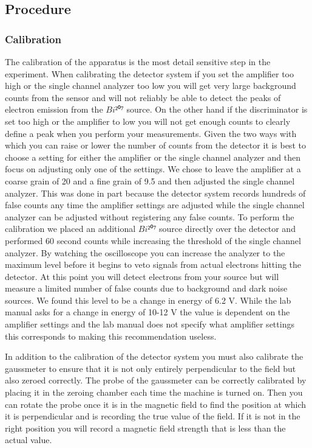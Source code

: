 \subsection{Procedure}

\subsubsection{Calibration}
The calibration of the apparatus is the most detail sensitive step in the experiment.  When calibrating the detector system if you set the amplifier too high or the single channel analyzer too low you will get very large background counts from the sensor and will not reliably be able to detect the peaks of electron emission from the $Bi²⁰⁷$ source.  On the other hand if the discriminator is set too high or the amplifier to low you will not get enough counts to clearly define a peak when you perform your measurements. Given the two ways with which you can raise or lower the number of counts from the detector it is best to choose a setting for either the amplifier or the single channel analyzer and then focus on adjusting only one of the settings.  We chose to leave the amplifier at a coarse grain of 20 and a fine grain of 9.5 and then adjusted the single channel analyzer.  This was done in part because the detector system records hundreds of false counts any time the amplifier settings are adjusted while the single channel analyzer can be adjusted without registering any false counts. To perform the calibration we placed an additional $Bi²⁰⁷$ source directly over the detector and performed 60 second counts while increasing the threshold of the single channel analyzer. By watching the oscilloscope you can increase the analyzer to the maximum level before it begins to veto signals from actual electrons hitting the detector. At this point you will detect electrons from your source but will measure a limited number of false counts due to background and dark noise sources.  We found this level to be a change in energy of 6.2 V.  While the lab manual asks for a change in energy of 10-12 V the value is dependent on the amplifier settings and the lab manual does not specify what amplifier settings this corresponds to making this recommendation useless.

In addition to the calibration of the detector system you must also calibrate the gaussmeter to ensure that it is not only entirely perpendicular to the field but also zeroed correctly.  The probe of the gaussmeter can be correctly calibrated by placing it in the zeroing chamber each time the machine is turned on. Then you can rotate the probe once it is in the magnetic field to find the position at which it is perpendicular and is recording the true value of the field. If it is not in the right position you will record a magnetic field strength that is less than the actual value.  


